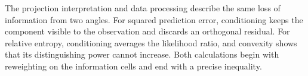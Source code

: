 The projection interpretation and data processing describe the same loss of information from two angles. For squared prediction error, conditioning keeps the component visible to the observation and discards an orthogonal residual. For relative entropy, conditioning averages the likelihood ratio, and convexity shows that its distinguishing power cannot increase. Both calculations begin with reweighting on the information cells and end with a precise inequality.
